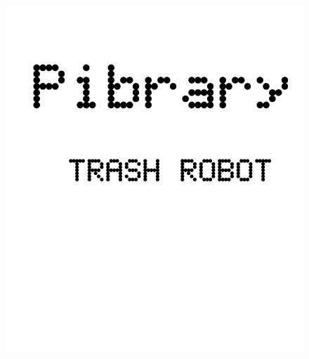 \documentclass[17pt]{extreport}
\begin{document}
	

        \begin{figure}
		\centering
		\includegraphics[width=8.0in]{imageset/uploadimages/cover.png}
	\end{figure}	
\end{document}
